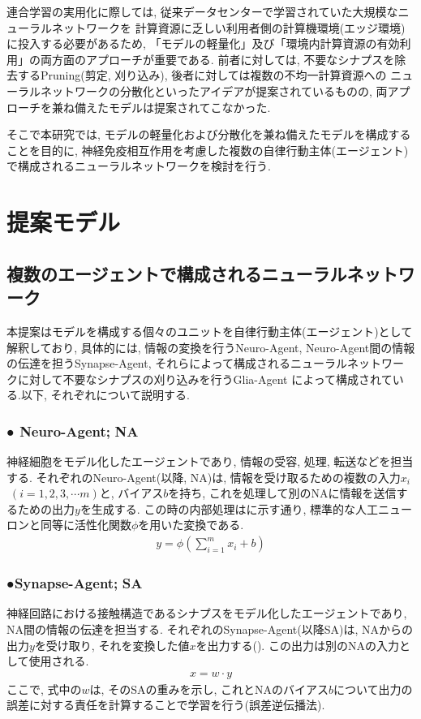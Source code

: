 \documentclass[a4paper, 10.5pt,twocolumn,dvipdfmx]{jsarticle}
\begin{document}
連合学習の実用化に際しては, 従来データセンターで学習されていた大規模なニューラルネットワークを
計算資源に乏しい利用者側の計算機環境(エッジ環境)に投入する必要があるため,  
「モデルの軽量化」及び「環境内計算資源の有効利用」の両方面のアプローチが重要である.
前者に対しては, 不要なシナプスを除去するPruning(剪定, 刈り込み), 
後者に対しては複数の不均一計算資源への
ニューラルネットワークの分散化といったアイデアが提案されているものの, 
両アプローチを兼ね備えたモデルは提案されてこなかった.

そこで本研究では, モデルの軽量化および分散化を兼ね備えたモデルを構成することを目的に, 
神経免疫相互作用を考慮した複数の自律行動主体(エージェント)で構成されるニューラルネットワークを検討を行う.
\section{提案モデル}
\subsection{複数のエージェントで構成されるニューラルネットワーク}
本提案はモデルを構成する個々のユニットを自律行動主体(エージェント)として解釈しており, 
具体的には, 情報の変換を行うNeuro-Agent, Neuro-Agent間の情報の伝達を担うSynapse-Agent, 
それらによって構成されるニューラルネットワークに対して不要なシナプスの刈り込みを行うGlia-Agent
によって構成されている.以下, それぞれについて説明する.
\vspace{2mm}
  \subsubsection*{● Neuro-Agent;\,\,NA}
  神経細胞をモデル化したエージェントであり, 情報の受容, 処理, 
  転送などを担当する.
  それぞれのNeuro-Agent(以降, NA)は, 情報を受け取るための複数の入力$x_i$ $\;(i= 1, 2, 3, \cdots m)$と, 
  バイアス$b$を持ち, 
  これを処理して別のNAに情報を送信するための出力$y$を生成する.
  この時の内部処理はに示す通り, 
  標準的な人工ニューロンと同等に活性化関数$\phi$を用いた変換である.
  \begin{align}
    y=\phi(\sum_{i=1}^m x_i+b)
    \label{eq:Neuro-Agent}
  \end{align}
  \subsubsection*{●Synapse-Agent;\,\,SA}
  神経回路における接触構造であるシナプスをモデル化したエージェントであり, 
  NA間の情報の伝達を担当する.
  それぞれのSynapse-Agent(以降SA)は, NAからの出力$y$を受け取り, それを変換した値$x$を出力する(). 
  この出力は別のNAの入力として使用される.
  \begin{align}
    x=w\cdot y
 \label{eq:Synapse-Agent}   
  \end{align}
  ここで, 式中の$w$は, そのSAの重みを示し, 
  これとNAのバイアス$b$について出力の誤差に対する責任を計算することで学習を行う(誤差逆伝播法).
  \vspace{2mm}
\end{document}
